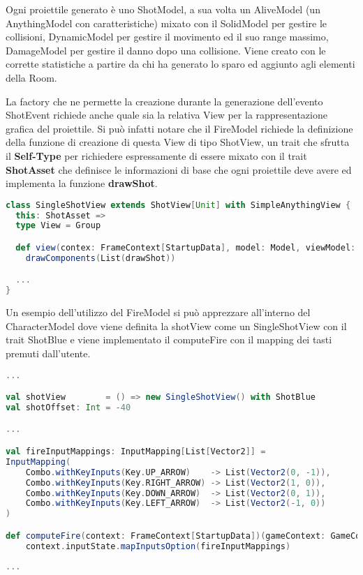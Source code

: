 Ogni proiettile generato è uno ShotModel, a sua volta un AliveModel (un AnythingModel con caratteristiche) mixato con 
il SolidModel per gestire le collisioni, DynamicModel per gestire il movimento ed il suo range massimo, DamageModel per gestire il danno dopo una collisione.
Viene creato con le corrette statistiche a partire da chi ha generato lo sparo ed aggiunto agli elementi della Room.

La factory che ne permette la creazione durante la generazione dell'evento ShotEvent 
richiede anche quale sia la relativa View per la rappresentazione grafica del proiettile.
Si può infatti notare che il FireModel richiede la definizione della funzione di creazione di questa View di tipo ShotView, 
un trait che sfrutta il \textbf{Self-Type} per richiedere espressamente di essere mixato 
con il trait \textbf{ShotAsset} che definisce le informazioni di base che ogni proiettile deve avere ed implementa la funzione \textbf{drawShot}.

\begin{lstlisting}[language=Scala]
class SingleShotView extends ShotView[Unit] with SimpleAnythingView {
  this: ShotAsset =>
  type View = Group

  def view(contex: FrameContext[StartupData], model: Model, viewModel: ViewModel): View =
    drawComponents(List(drawShot))

  ...
}
\end{lstlisting}

Un esempio dell'utilizzo del FireModel si può apprezzare all'interno del CharacterModel 
dove viene definita la shotView come un SingleShotView con il trait ShotBlue
e viene implementato il computeFire con il mapping dei tasti premuti dall'utente.

\begin{lstlisting}[language=Scala]
...

val shotView        = () => new SingleShotView() with ShotBlue
val shotOffset: Int = -40

...

val fireInputMappings: InputMapping[List[Vector2]] =
InputMapping(
	Combo.withKeyInputs(Key.UP_ARROW)    -> List(Vector2(0, -1)),
	Combo.withKeyInputs(Key.RIGHT_ARROW) -> List(Vector2(1, 0)),
	Combo.withKeyInputs(Key.DOWN_ARROW)  -> List(Vector2(0, 1)),
	Combo.withKeyInputs(Key.LEFT_ARROW)  -> List(Vector2(-1, 0))
)

def computeFire(context: FrameContext[StartupData])(gameContext: GameContext): Option[List[Vector2]] =
	context.inputState.mapInputsOption(fireInputMappings)
	
...
\end{lstlisting}

